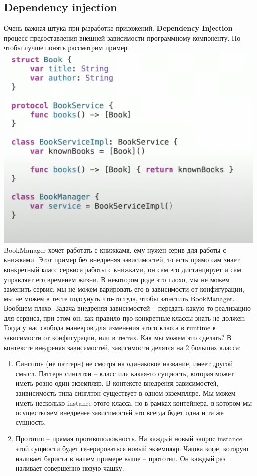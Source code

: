\documentclass{article}
\begin{document}
    \subsection{Dependency injection}
    Очень важная штука при разработке приложений. \textbf{Dependency Injection} -- процесс предоставления внешней зависимости программному компоненту. Но чтобы лучше понять рассмотрим пример: 
    \newline
        \includegraphics[scale = 0.5]{pic/Снимок экрана 2023-07-31 в 00.52.26.png}
    \newline
    BookManager хочет работать с книжками, ему нужен серив для работы с книжками. Этот пример без внедреняя зависимостей, то есть  прямо сам знает конкретный класс сервиса работы с книжками, он сам его дистанцирует и сам управляет его временем жизни. В некотором роде это плохо, мы не можем заменить сервис, мы не можем варировать его в зависимости от конфигурации, мы не можем в тесте подсунуть что-то туда, чтобы затестить BookManager. Вообщем плохо. Задача внедреняя зависимостей -- передать какую-то реализацию для сервиса, при этом он, как правило про конкретные классы знать не должен. Тогда у нас свобода маневров для изменения этого класса в runtime в зависимости от конфигурации, или в тестах. Как мы можем это сделать? 
    \newline
    В контексте внедреняя зависимостей, зависимости делятся на 2 больших класса: 
    \begin{enumerate}
        \item Синглтон (не паттерн) не смотря на одинаковое название, имеет другой смысл. Паттерн синглтон -- класс или какая-то сущность, которая может иметь ровно один экземпляр. В контексте внедреняя зависимостей, заивисимость типа синглтон существует в одном экземпляре. Мы можем иметь несколько instance этого класса, но в рамках контейнера, в котором мы осуществляем внедренее зависимостей это всегда будет одна и та же сущность.  
        \item  Прототип -- прямая противоположность. На каждый новый запрос instance этой сущности будет генерироваться новый экземпляр. Чашка кофе, которую наливает бариста в нашем примере выше -- прототип. Он каждый раз наливает совершенно новую чашку. 
    \end{enumerate}
\end{document}
